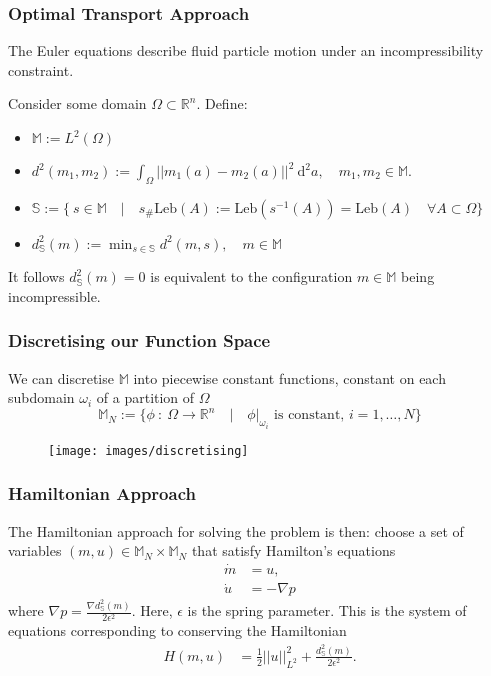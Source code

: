 \documentclass[10pt]{beamer}
\newcommand{\R}{\mathbb{R}}
\newcommand{\MN}{\mathbb{M}_N}
\newcommand{\dsmsq}{d^{2}_{\mathbb{S}}(m)}
\newcommand{\graddsmsq}{\nabla{d^{2}_{\mathbb{S}}(m)}}
\newcommand{\M}{\mathbb{M}}
\newcommand{\Sb}{\mathbb{S}}
\newcommand{\Leb}{\mathrm{Leb}}
\begin{document}
\frame
{
  \frametitle{Optimal Transport Approach}
  
\begin{block}{}
The Euler equations describe fluid particle motion under an incompressibility constraint.
\end{block} 

Consider some domain \(\Omega \subset \R^n\). Define:

\begin{itemize}

\item \(\M := L^2(\Omega)\)

\item \(d^2(m_1, m_2) := \int_\Omega || m_1(a) - m_2(a) ||^2 \: \mathrm{d}^2 a, \quad m_1, m_2 \in \M.\)

\item \(\Sb := \Big\{ \: s \in \M \quad | \quad s_{\#}\Leb(A) := \Leb(s^{-1}(A)) = \Leb(A) \quad \forall A \subset \Omega \Big\}\)

\item \(\dsmsq := \min_{s \in \mathbb{S}} d^2(m, s), \quad m \in \M\)

\end{itemize}

\begin{block}{}
It follows \(\dsmsq = 0\) is equivalent to the configuration \(m \in \M\) being incompressible.
\end{block}

}

\frame
{
  \frametitle{Discretising our Function Space}  

We can discretise \(\M\) into piecewise constant functions, constant on each subdomain \(\omega_i\) of a partition of \(\Omega\)
\[ 
\MN := \Big\{ \phi \: : \: \Omega \to \R^n \quad | \quad \phi | _{\omega_i} \text{ is constant, } i = 1,\dots,N \Big\}
\]

\begin{figure}[H]
\texttt{[image: images/discretising]}
\centering
\label{fig:discretising}
\end{figure}

}

\frame
{
  \frametitle{Hamiltonian Approach}

The Hamiltonian approach for solving the problem is then: choose a set of variables \((m, u) \in \MN \times \MN \) that satisfy Hamilton's equations
\begin{align} 
\dot{m} &= u, \\
\dot{u} &= - \nabla p
\end{align}
where \(\nabla p = \frac{\graddsmsq}{2\epsilon^2}\). Here, \(\epsilon\) is the spring parameter. This is the system of equations corresponding to conserving the Hamiltonian
\begin{align} 
H(m, u) &= \frac{1}{2} ||u||^2_{L^2} + \frac{\dsmsq}{2\epsilon^2}.
\end{align}
}
\end{document}

